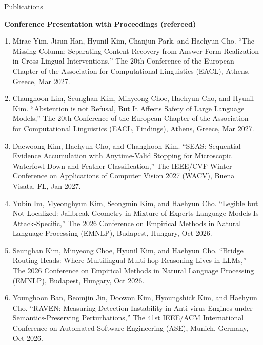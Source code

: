 \documentclass{resume} %
\begin{document}
\begin{rSection}{\faGenderless~Publications}

    \strut\textbullet~{\bf Conference Presentation with Proceedings (refereed)}
    \begin{enumerate}[leftmargin=0pt]
    	\item Mirae Yim, Jisun Han, Hyunil Kim, Chanjun Park, and {Haehyun Cho}.
    	``The Missing Column: Separating Content Recovery from Answer-Form Realization in Cross-Lingual Interventions,''
    	The 20th Conference of the European Chapter of the Association for Computational Linguistics (EACL), Athens, Greece, Mar 2027.

    	\item Changhoon Lim, Seunghan Kim, Minyeong Choe, {Haehyun Cho}, and Hyunil Kim.
    	``Abstention is not Refusal, But It Affects Safety of Large Language Models,''
    	The 20th Conference of the European Chapter of the Association for Computational Linguistics (EACL, Findings), Athens, Greece, Mar 2027.

        \item Daewoong Kim, {Haehyun Cho}, and Changhoon Kim.
        ``SEAS: Sequential Evidence Accumulation with Anytime-Valid Stopping for Microscopic Waterfowl Down and Feather Classification,''
        The IEEE/CVF Winter Conference on Applications of Computer Vision 2027 (WACV), Buena Visata, FL, Jan 2027.

    	\item Yubin Im, Myeonghyun Kim, Seongmin Kim, and {Haehyun Cho}.
    	``Legible but Not Localized: Jailbreak Geometry in Mixture-of-Experts Language Models Is Attack-Specific,''
    	The 2026 Conference on Empirical Methods in Natural Language Processing (EMNLP), Budapest, Hungary, Oct 2026.

    	\item Seunghan Kim, Minyeong Choe, Hyunil Kim, and {Haehyun Cho}.
    	``Bridge Routing Heads: Where Multilingual Multi-hop Reasoning Lives in LLMs,''
    	The 2026 Conference on Empirical Methods in Natural Language Processing (EMNLP), Budapest, Hungary, Oct 2026.

    	\item Younghoon Ban, Beomjin Jin, Doowon Kim, Hyoungshick Kim, and {Haehyun Cho}.
		``RAVEN: Measuring Detection Instability in Anti-virus Engines under Semantics-Preserving Perturbations,''
		The 41st IEEE/ACM International Conference on Automated Software Engineering (ASE), Munich, Germany, Oct 2026.


\end{enumerate}
\end{rSection}
\end{document}
